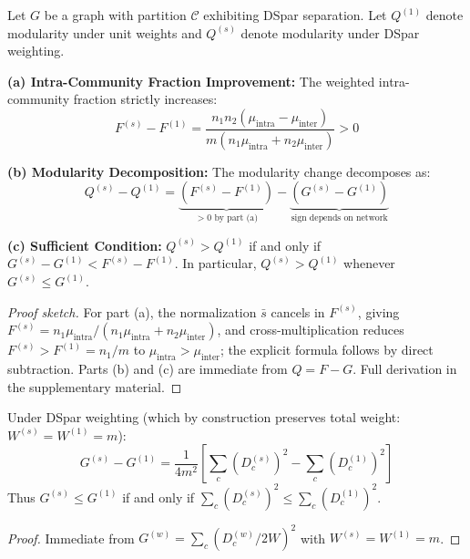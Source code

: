 \begin{theorem}
\label{thm:modularity}
Let $G$ be a graph with partition $\mathcal{C}$ exhibiting DSpar separation. Let $Q^{(1)}$ denote modularity under unit weights and $Q^{(s)}$ denote modularity under DSpar weighting.

\textbf{(a) Intra-Community Fraction Improvement:} The weighted intra-community fraction strictly increases:
\begin{equation}
F^{(s)} - F^{(1)} = \frac{n_1 n_2 (\mu_{\text{intra}} - \mu_{\text{inter}})}{m(n_1 \mu_{\text{intra}} + n_2 \mu_{\text{inter}})} > 0
\end{equation}

\textbf{(b) Modularity Decomposition:} The modularity change decomposes as:
\begin{equation}
Q^{(s)} - Q^{(1)} = \underbrace{(F^{(s)} - F^{(1)})}_{> 0 \text{ by part (a)}} - \underbrace{(G^{(s)} - G^{(1)})}_{\text{sign depends on network}}
\end{equation}

\textbf{(c) Sufficient Condition:} $Q^{(s)} > Q^{(1)}$ if and only if $G^{(s)} - G^{(1)} < F^{(s)} - F^{(1)}$.
In particular, $Q^{(s)} > Q^{(1)}$ whenever $G^{(s)} \leq G^{(1)}$.
\end{theorem}

\begin{proof}[Proof sketch]
For part (a), the normalization $\bar{s}$ cancels in $F^{(s)}$, giving $F^{(s)} = n_1 \mu_{\text{intra}} / (n_1 \mu_{\text{intra}} + n_2 \mu_{\text{inter}})$, and cross-multiplication reduces $F^{(s)} > F^{(1)} = n_1/m$ to $\mu_{\text{intra}} > \mu_{\text{inter}}$; the explicit formula follows by direct subtraction. Parts (b) and (c) are immediate from $Q = F - G$. Full derivation in the supplementary material.
\end{proof}

\begin{lemma}
\label{lem:G_change}
Under DSpar weighting (which by construction preserves total weight: $W^{(s)} = W^{(1)} = m$):
\begin{equation}
G^{(s)} - G^{(1)} = \frac{1}{4m^2} \left[ \sum_c (D_c^{(s)})^2 - \sum_c (D_c^{(1)})^2 \right]
\end{equation}
Thus $G^{(s)} \leq G^{(1)}$ if and only if $\sum_c (D_c^{(s)})^2 \leq \sum_c (D_c^{(1)})^2$.
\end{lemma}

\begin{proof}
Immediate from $G^{(w)} = \sum_c (D_c^{(w)}/2W)^2$ with $W^{(s)} = W^{(1)} = m$.
\end{proof}

